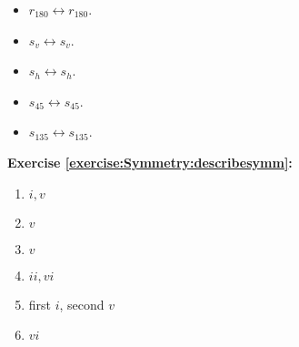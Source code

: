 \begin{enumerate}[(a)]
\begin{multicols}{3}
\begin{itemize}
	\item
	$r_{180} \leftrightarrow r_{180}$.
	
	\item
	$s_v \leftrightarrow s_v$.
	
	\item
	$s_h \leftrightarrow s_h$.
	
	\item
	$s_{45} \leftrightarrow s_{45}$.
	
	\item
	$s_{135} \leftrightarrow s_{135}$.
	\end{itemize}
	\end{multicols}
\end{enumerate}

\noindent\textbf{Exercise \ref{exercise:Symmetry:describesymm}:}
\begin{multicols}{3}
\begin{enumerate}[{a.}]
\item
$i, v$

\item
$v$

\item
$v$

\item
$ii, vi$

\item
first $i$, second $v$

\item
$vi$
\end{enumerate}
\end{multicols}

